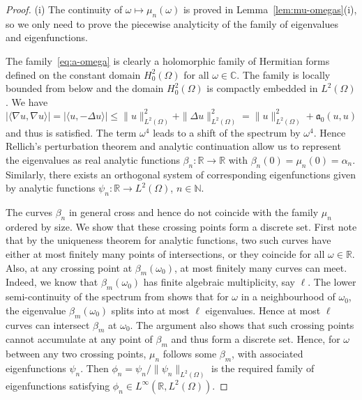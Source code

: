 \documentclass[a4paper, reqno,titlepage]{amsart}
\numberwithin{equation}{section}
\theoremstyle{plain}
\theoremstyle{definition}
\theoremstyle{remark}
\newcommand{\mfra}{\mathfrak{a}}
\newcommand{\NN}{\mathbb{N}}
\newcommand{\RR}{\mathbb{R}}
\newcommand{\CC}{\mathbb{C}}
\begin{document}
\begin{proof}
  (i) The continuity of $\omega\mapsto\mu_n(\omega)$ is proved in Lemma~\ref{lem:mu-omegas}(i), so we only need to prove the piecewise analyticity of the family of eigenvalues and eigenfunctions.

  The family~\eqref{eq:a-omega} is clearly a holomorphic family of Hermitian forms defined on the constant domain $H_0^2(\Omega)$ for all $\omega\in\CC$. The family is locally bounded from below and the domain $H_0^2(\Omega)$ is compactly embedded in $L^2(\Omega)$. We have
  \begin{equation*}
    |\langle\nabla u,\nabla u\rangle|
    =|\langle u,-\Delta u\rangle|
    \leq\|u\|^2_{L^2(\Omega)}+\|\Delta u\|^2_{L^2(\Omega)}
    =\|u\|^2_{L^2(\Omega)}+\mfra_0(u,u)
  \end{equation*}
  and thus \cite[Criterion~4, page~111]{R69} is satisfied. The term $\omega^4$ leads to a shift of the spectrum by $\omega^4$. Hence Rellich's perturbation theorem \cite[Theorem~II.10.1]{R69} and analytic continuation allow us to represent the eigenvalues as real analytic functions $\beta_n\colon\RR\to\RR$ with $\beta_n(0)=\mu_n(0)=\alpha_n$. Similarly, there exists an orthogonal system of corresponding eigenfunctions given by analytic functions $\psi_n\colon\RR\to L^2(\Omega)$, $n\in\NN$.

  The curves $\beta_n$ in general cross and hence do not coincide with the family $\mu_n$ ordered by size. We show that these crossing points form a discrete set. First note that by the uniqueness theorem for analytic functions, two such curves have either at most finitely many points of intersections, or they coincide for all $\omega\in\RR$. Also, at any crossing point at $\beta_m(\omega_0)$, at most finitely many curves can meet. Indeed, we know that $\beta_m(\omega_0)$ has finite algebraic multiplicity, say $\ell$. The lower semi-continuity of the spectrum from \cite[Theorem IV.3.16]{KAT} shows that for $\omega$ in a neighbourhood of $\omega_0$, the eigenvalue $\beta_m(\omega_0)$ splits into at most $\ell$ eigenvalues. Hence at most $\ell$ curves can intersect $\beta_m$ at $\omega_0$. The argument also shows that such crossing points cannot accumulate at any point of $\beta_m$ and thus form a discrete set. Hence, for $\omega$ between any two crossing points, $\mu_n$ follows some $\beta_m$, with associated eigenfunctions $\psi_n$. Then $\phi_n = \psi_n / \|\psi_n\|_{L^2(\Omega)}$ is the required family of eigenfunctions satisfying $\phi_n \in L^\infty(\RR, L^2(\Omega))$.


\end{proof}
\end{document}
